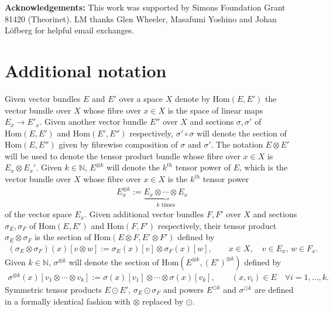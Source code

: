 \documentclass{article}
\newcommand{\NB}{\mathbb{N}}
\newcommand{\Hom}{\mathrm{Hom}}
\theoremstyle{plain}
\theoremstyle{definition}
\theoremstyle{remark}
\begin{document}
\textbf{Acknowledgements:} This work was supported by Simons Foundation Grant 81420 (Theorinet). LM thanks Glen Wheeler, Masafumi Yoshino and Johan L\"{o}fberg for helpful email exchanges.





\newpage

\appendix

\section{Additional notation}\label{app:notation}

Given vector bundles $E$ and $E'$ over a space $X$ denote by $\mathrm{Hom}(E,E')$ the vector bundle over $X$ whose fibre over $x\in X$ is the space of linear maps $E_x\rightarrow E'_x$. Given another vector bundle $E''$ over $X$ and sections $\sigma,\sigma'$ of $\mathrm{Hom}(E,E')$ and $\mathrm{Hom}(E',E'')$ respectively, $\sigma'\circ\sigma$ will denote the section of $\Hom(E,E'')$ given by fibrewise composition of $\sigma$ and $\sigma'$. The notation $E\otimes E'$ will be used to denote the tensor product bundle whose fibre over $x\in X$ is $E_x\otimes E_x'$. Given $k\in\NB$, $E^{\otimes k}$ will denote the $k^{th}$ tensor power of $E$, which is the vector bundle over $X$ whose fibre over $x\in X$ is the $k^{th}$ tensor power
\begin{align}
E_x^{\otimes k}:=\underbrace{E_x\otimes\cdots\otimes E_x}_{\text{$k$ times}}
\end{align}
of the vector space $E_x$. Given additional vector bundles $F,F'$ over $X$ and sections $\sigma_E,\sigma_F$ of $\mathrm{Hom}(E,E')$ and $\Hom(F,F')$ respectively, their tensor product $\sigma_E\otimes\sigma_F$ is the section of $\Hom(E\otimes F,E'\otimes F')$ defined by
\begin{align}
(\sigma_E\otimes\sigma_F)(x)[v\otimes w]:=\sigma_E(x)[v]\otimes\sigma_F(x)[w],\qquad x\in X,\quad v\in E_x,\,w\in F_x.
\end{align}
Given $k\in\NB$, $\sigma^{\otimes k}$ will denote the section of $\Hom(E^{\otimes k},(E')^{\otimes k})$ defined by
\begin{align}
\sigma^{\otimes k}(x)[v_1\otimes\cdots\otimes v_k]:=\sigma(x)[v_1]\otimes\cdots\otimes\sigma(x)[v_k],\qquad (x,v_i)\in E\quad \forall i=1,\dots,k.
\end{align}
Symmetric tensor products $E\odot E'$, $\sigma_E\odot\sigma_F$ and powers $E^{\odot k}$ and $\sigma^{\odot k}$ are defined in a formally identical fashion with $\otimes$ replaced by $\odot$.
\end{document}
